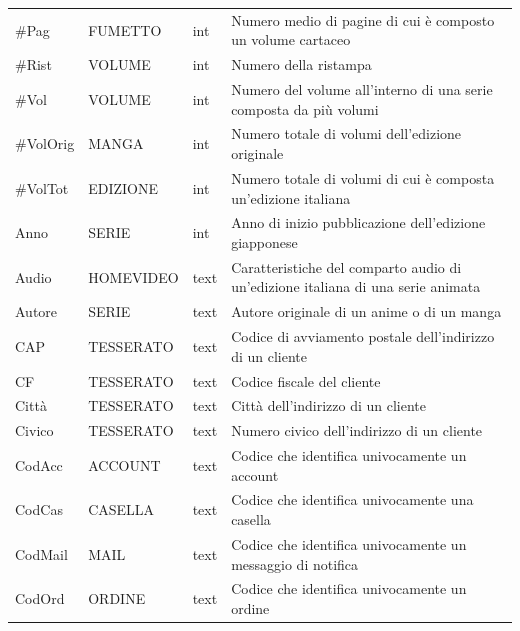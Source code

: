 \documentclass[a4paper]{scrartcl}
\begin{document}
\begin{footnotesize}
\begin{longtable}{p{} p{} p{} p{}}
	\#{Pag} &
	FUMETTO &
	int &
	Numero medio di pagine di cui è composto un volume cartaceo \\
	
	\#{Rist} &
	VOLUME &
	int &
	Numero della ristampa \\
	
	\#{Vol} &
	VOLUME &
	int &
	Numero del volume all'interno di una serie composta da più volumi \\
	
	\#{VolOrig} &
	MANGA &
	int &
	Numero totale di volumi dell'edizione originale \\
	
	\#{VolTot} &
	EDIZIONE &
	int &
	Numero totale di volumi di cui è composta un'edizione italiana \\
	
	Anno &
	SERIE &
	int &
	Anno di inizio pubblicazione dell'edizione giapponese \\
	
	Audio &
	HOMEVIDEO &
	text &
	Caratteristiche del comparto audio di un'edizione italiana di una serie animata \\
	
	Autore &
	SERIE &
	text &
	Autore originale di un anime o di un manga \\
	
	CAP &
	TESSERATO &
	text &
	Codice di avviamento postale dell'indirizzo di un cliente \\
	
	CF &
	TESSERATO &
	text &
	Codice fiscale del cliente \\
	
	Città &
	TESSERATO &
	text &
	Città dell'indirizzo di un cliente \\
	
	Civico &
	TESSERATO &
	text &
	Numero civico dell'indirizzo di un cliente \\
	
	CodAcc &
	ACCOUNT &
	text &
	Codice che identifica univocamente un account \\
	
	CodCas &
	CASELLA &
	text &
	Codice che identifica univocamente una casella \\
	
	CodMail &
	MAIL &
	text &
	Codice che identifica univocamente un messaggio di notifica \\
	
	CodOrd &
	ORDINE &
	text &
	Codice che identifica univocamente un ordine \\
	

\end{longtable}
\end{footnotesize}
\end{document}
